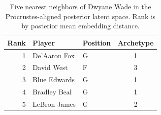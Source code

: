 \begin{table}[htbp]
  \centering\small
  \begin{tabular}{rllc}
    \toprule
    Rank & Player & Position & Archetype \\
    \midrule
    1 & De'Aaron Fox & G & 1 \\
    2 & David West & F & 3 \\
    3 & Blue Edwards & G & 1 \\
    4 & Bradley Beal & G & 1 \\
    5 & LeBron James & G & 2 \\
    \bottomrule
  \end{tabular}
  \caption{Five nearest neighbors of Dwyane Wade in the Procrustes-aligned posterior latent space. Rank is by posterior mean embedding distance.}
  \label{tab:Dwyane_Wade_neighbors}
\end{table}

